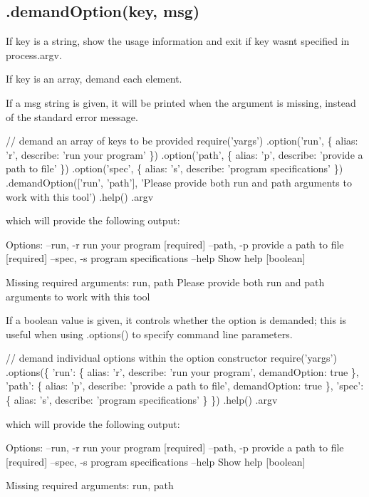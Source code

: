 \subsection*{.demand\+Option(key, msg) }

If {\ttfamily key} is a string, show the usage information and exit if {\ttfamily key} wasn\textquotesingle{}t specified in {\ttfamily process.\+argv}.

If {\ttfamily key} is an array, demand each element.

If a {\ttfamily msg} string is given, it will be printed when the argument is missing, instead of the standard error message.


\begin{DoxyCode}
// demand an array of keys to be provided
require('yargs')
  .option('run', \{
    alias: 'r',
    describe: 'run your program'
  \})
  .option('path', \{
    alias: 'p',
    describe: 'provide a path to file'
  \})
  .option('spec', \{
    alias: 's',
    describe: 'program specifications'
  \})
  .demandOption(['run', 'path'], 'Please provide both run and path arguments to work with this tool')
  .help()
  .argv
\end{DoxyCode}
 which will provide the following output\+: 
\begin{DoxyCode}
Options:
  --run, -r   run your program                [required]
  --path, -p  provide a path to file          [required]
  --spec, -s  program specifications
  --help      Show help                        [boolean]

  Missing required arguments: run, path
  Please provide both run and path arguments to work with this tool
\end{DoxyCode}


If a {\ttfamily boolean} value is given, it controls whether the option is demanded; this is useful when using {\ttfamily .options()} to specify command line parameters.


\begin{DoxyCode}
// demand individual options within the option constructor
require('yargs')
  .options(\{
    'run': \{
      alias: 'r',
      describe: 'run your program',
      demandOption: true
    \},
    'path': \{
      alias: 'p',
      describe: 'provide a path to file',
      demandOption: true
    \},
    'spec': \{
      alias: 's',
      describe: 'program specifications'
    \}
  \})
  .help()
  .argv
\end{DoxyCode}
 which will provide the following output\+: 
\begin{DoxyCode}
Options:
  --run, -r   run your program                                       [required]
  --path, -p  provide a path to file                                 [required]
  --spec, -s  program specifications
  --help      Show help                                               [boolean]

Missing required arguments: run, path
\end{DoxyCode}


